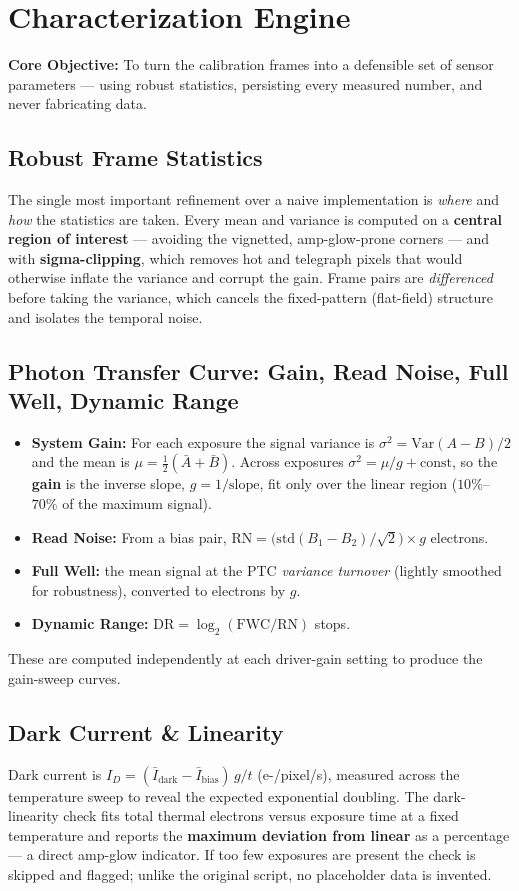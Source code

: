 \documentclass[11pt,a4paper]{article}
\begin{document}
\section{Characterization Engine}
\textbf{Core Objective:} To turn the calibration frames into a defensible set of sensor parameters --- using robust statistics, persisting every measured number, and never fabricating data.

\subsection{Robust Frame Statistics}
The single most important refinement over a naive implementation is \emph{where} and \emph{how} the statistics are taken. Every mean and variance is computed on a \textbf{central region of interest} --- avoiding the vignetted, amp-glow-prone corners --- and with \textbf{sigma-clipping}, which removes hot and telegraph pixels that would otherwise inflate the variance and corrupt the gain. Frame pairs are \emph{differenced} before taking the variance, which cancels the fixed-pattern (flat-field) structure and isolates the temporal noise.

\subsection{Photon Transfer Curve: Gain, Read Noise, Full Well, Dynamic Range}
\begin{itemize}[leftmargin=*]
    \item \textbf{System Gain:} For each exposure the signal variance is $\sigma^2 = \mathrm{Var}(A-B)/2$ and the mean is $\mu = \tfrac{1}{2}(\bar A + \bar B)$. Across exposures $\sigma^2 = \mu/g + \mathrm{const}$, so the \textbf{gain} is the inverse slope, $g = 1/\text{slope}$, fit only over the linear region ($10\%$--$70\%$ of the maximum signal).
    \item \textbf{Read Noise:} From a bias pair, $\mathrm{RN} = \big(\mathrm{std}(B_1-B_2)/\sqrt{2}\big)\times g$ electrons.
    \item \textbf{Full Well:} the mean signal at the PTC \emph{variance turnover} (lightly smoothed for robustness), converted to electrons by $g$.
    \item \textbf{Dynamic Range:} $\mathrm{DR} = \log_2(\mathrm{FWC}/\mathrm{RN})$ stops.
\end{itemize}
These are computed independently at each driver-gain setting to produce the gain-sweep curves.

\subsection{Dark Current \& Linearity}
Dark current is $I_D = (\bar I_{\mathrm{dark}} - \bar I_{\mathrm{bias}})\,g/t$ (e-/pixel/s), measured across the temperature sweep to reveal the expected exponential doubling. The dark-linearity check fits total thermal electrons versus exposure time at a fixed temperature and reports the \textbf{maximum deviation from linear} as a percentage --- a direct amp-glow indicator. If too few exposures are present the check is skipped and flagged; unlike the original script, no placeholder data is invented.
\end{document}
